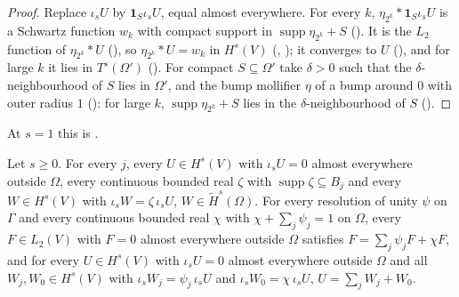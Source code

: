 \begin{proof}
\leanok
Replace $\iota_s U$ by $\mathbf 1_S \iota_s U$, equal almost everywhere. For every $k$,
$\eta_{2^k} * \mathbf 1_S \iota_s U$ is a Schwartz function $w_k$ with compact support in
$\operatorname{supp} \eta_{2^k} + S$ (). It is the $L_2$
function of $\eta_{2^k} * U$ (), so $\eta_{2^k} * U = w_k$ in
$H^s(V)$ (, ); it converges to $U$
(), and for large $k$ it lies in $T^s(\Omega')$
(). For compact $S \subseteq \Omega'$ take $\delta > 0$ such
that the $\delta$-neighbourhood of $S$ lies in $\Omega'$, and the bump mollifier $\eta$ of a
bump around $0$ with outer radius $1$ (): for large $k$,
$\operatorname{supp} \eta_{2^k} + S$ lies in the $\delta$-neighbourhood of $S$
().
\end{proof}

At $s = 1$ this is .

\begin{lemma}
\label{lem:tilde-space-chart-pieces-general}
\leanok
{}
Let $s \geq 0$. For every $j$, every $U \in H^s(V)$ with $\iota_s U = 0$ almost everywhere
outside $\Omega$, every continuous bounded real $\zeta$ with $\operatorname{supp} \zeta \subseteq
B_j$ and every $W \in H^s(V)$ with $\iota_s W = \zeta \, \iota_s U$, $W \in \tilde H^s(\Omega)$.
For every resolution of unity $\psi$ on $\Gamma$ and every continuous bounded real $\chi$ with
$\chi + \sum_j \psi_j = 1$ on $\Omega$, every $F \in L_2(V)$ with $F = 0$ almost everywhere
outside $\Omega$ satisfies $F = \sum_j \psi_j F + \chi F$, and for every $U \in H^s(V)$ with
$\iota_s U = 0$ almost everywhere outside $\Omega$ and all $W_j, W_0 \in H^s(V)$ with
$\iota_s W_j = \psi_j \, \iota_s U$ and $\iota_s W_0 = \chi \, \iota_s U$,
$U = \sum_j W_j + W_0$.
\end{lemma}

